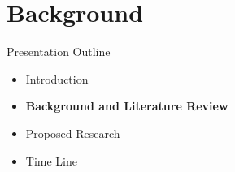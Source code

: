 \documentclass{beamer}
\begin{document}
\section{Background}
\begin{frame}{Presentation Outline}
    \begin{itemize}
     	\itemsep=.5cm
    	\item Introduction
    	\item {\bf Background and Literature Review}
    	\item Proposed Research
    	\item Time Line
    \end{itemize}
\end{frame}

\end{document}
